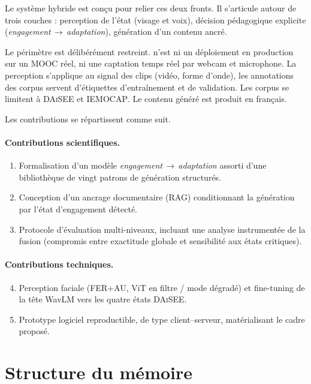 Le système hybride \emolearn{} est conçu pour relier ces deux fronts. Il
s'articule autour de trois couches : perception de l'état
(visage et voix), décision pédagogique explicite
(\emph{engagement\,$\rightarrow$\,adaptation}), génération d'un
contenu ancré.

Le périmètre est délibérément restreint. \emolearn{} n'est ni un
déploiement en production sur un MOOC réel, ni une captation temps réel
par webcam et microphone. La perception s'applique au signal des
clips (vidéo, forme d'onde), les annotations des corpus servent
d'étiquettes d'entraînement et de validation. Les corpus se limitent à
\textsc{DAiSEE} et \textsc{IEMOCAP}. Le contenu généré est produit en
français.

Les contributions se répartissent comme suit.

\paragraph{Contributions scientifiques.}
\begin{enumerate}
  \item Formalisation d'un modèle \emph{engagement\,$\rightarrow$\,adaptation}
  assorti d'une bibliothèque de vingt patrons de génération structurés.

  \item Conception d'un ancrage documentaire (RAG) conditionnant la
  génération par l'état d'engagement détecté.

  \item Protocole d'évaluation multi-niveaux, incluant une analyse
  instrumentée de la fusion (compromis entre exactitude globale et
  sensibilité aux états critiques).
\end{enumerate}

\paragraph{Contributions techniques.}
\begin{enumerate}
  \setcounter{enumi}{3}
  \item Perception faciale (FER+AU, ViT en filtre / mode dégradé) et
  fine-tuning de la tête WavLM vers les quatre états \textsc{DAiSEE}.

  \item Prototype logiciel reproductible, de type client--serveur,
  matérialisant le cadre proposé.
\end{enumerate}


\section*{Structure du mémoire}
\label{sec:structure}

